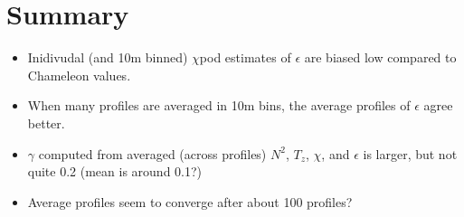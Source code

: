 \documentclass[11pt]{article}
\begin{document}
\clearpage
\section{Summary}

\begin{itemize}
\item Inidivudal (and 10m binned) $\chi$pod estimates of $\epsilon$ are biased low compared to Chameleon values.
\item When many profiles are averaged in 10m bins, the average profiles of $\epsilon$ agree better.
\item $\gamma$ computed from averaged (across profiles) $N^2$, $T_z$, $\chi$, and $\epsilon$ is larger, but not quite 0.2 (mean is around 0.1?)
\item Average profiles seem to converge after about 100 profiles?
\end{itemize}
\end{document}
